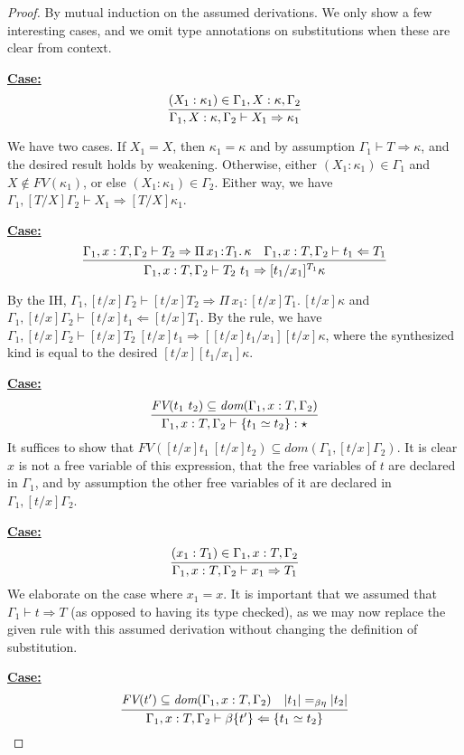 \documentclass{article}
\newcommand{\abs}[4]{{#1}\, #2\! : \! #3.\, #4}
\newcommand{\tpcheck}[0]{\Leftarrow}
\newcommand{\tpsynth}[0]{\Rightarrow}
\newcommand{\startcase}[1]{\vspace{#1} \noindent\textbf{\underline{Case:}}}
\begin{document}
\begin{proof}
  By mutual induction on the assumed derivations.
  We only show a few interesting cases, and we omit type annotations on
  substitutions when these are clear from context.
  
  \startcase{.2cm}
  \[
    \infer{\Gamma_1,X:\kappa,\Gamma_2 \vdash X_1 \tpsynth \kappa_1}{(X_1 : \kappa_1) \in \Gamma_1,X:\kappa,\Gamma_2}
  \]

  We have two cases.
  If \(X_1 = X\), then \(\kappa_1 = \kappa\) and by assumption \(\Gamma_1 \vdash
  T \tpsynth \kappa\), and the desired result holds by weakening.
  Otherwise, either \((X_1 : \kappa_1) \in \Gamma_1\) and \(X \notin
  \textit{FV}(\kappa_1)\), or else \((X_1 : \kappa_1) \in \Gamma_2\).
  Either way, we have \(\Gamma_1,[T/X]\Gamma_2 \vdash X_1 \tpsynth
  [T/X]\kappa_1\).

  \startcase{.2cm}
  \[ \infer{\Gamma_1,x:T,\Gamma_2\vdash T_2\ t_1 \tpsynth [t_1/x_1]^{T_1}\kappa
    }{
      \Gamma_1,x:T,\Gamma_2\vdash T_2 \tpsynth \abs{\Pi}{x_1}{T_1}{\kappa}
      & \Gamma_1,x:T,\Gamma_2\vdash t_1 \tpcheck T_1
    }
  \]

  By the IH, \(\Gamma_1,[t/x]\Gamma_2 \vdash [t/x]T_2 \tpsynth
  \abs{\Pi}{x_1}{[t/x]T_1}{[t/x]\kappa}\) and \(\Gamma_1,[t/x]\Gamma_2 \vdash
  [t/x]t_1 \tpcheck [t/x]T_1\).
  By the rule, we have \(\Gamma_1,[t/x]\Gamma_2 \vdash [t/x]T_2\ [t/x]t_1
  \tpsynth [[t/x]t_1/x_1][t/x]\kappa\), where the synthesized kind is equal to
  the desired \([t/x][t_1/x_1]\kappa\).

  \startcase{.2cm}
  \[
    \infer{
      \Gamma_1,x:T,\Gamma_2\vdash \{ t_1 \simeq t_2 \} : \star
    }{
      \textit{FV}(t_1\ t_2)\subseteq\textit{dom}(\Gamma_1,x:T,\Gamma_2)
    }
  \]
  It suffices to show that \(\textit{FV}([t/x]t_1\ [t/x]t_2) \subseteq
  \textit{dom}(\Gamma_1,[t/x]\Gamma_2)\).
  It is clear \(x\) is not a free variable of this expression, that the free
  variables of \(t\) are declared in \(\Gamma_1\), and by assumption the other
  free variables of it are declared in \(\Gamma_1,[t/x]\Gamma_2\).

  \startcase{.2cm}
  \[
    \infer{\Gamma_1,x:T,\Gamma_2 \vdash x_1\tpsynth T_1}{(x_1 : T_1) \in \Gamma_1,x:T,\Gamma_2}
  \]
  We elaborate on the case where \(x_1 = x\).
  It is important that we assumed that \(\Gamma_1 \vdash t \tpsynth T\) (as
  opposed to having its type checked), as we may now replace the given rule with
  this assumed derivation without changing the definition of substitution.

  \startcase{.2cm}
  \[
    \infer{\Gamma_1,x:T,\Gamma_2\vdash \beta\{t'\} \tpcheck \{ t_1 \simeq t_2 \}}
    {\textit{FV}(t')\subseteq \textit{dom}(\Gamma_1,x:T,\Gamma_2) \quad |t_1| =_{\beta\eta} |t_2|}
  \]


\end{proof}
\end{document}
